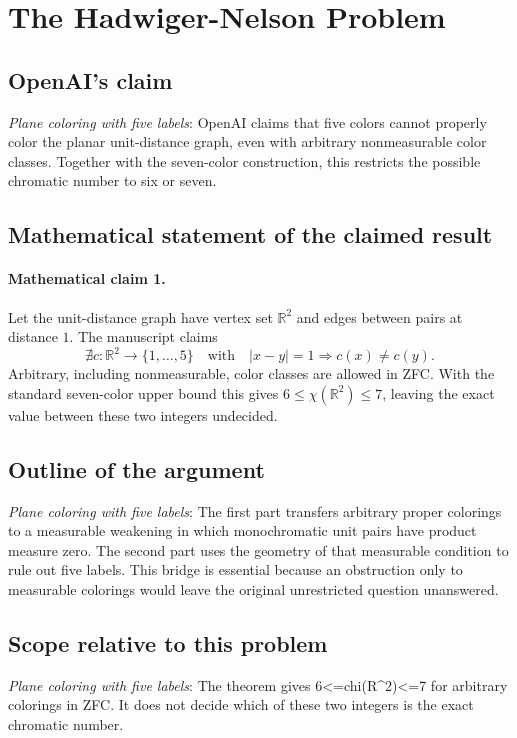 \documentclass[11pt]{article}
\begin{document}
\section*{The Hadwiger-Nelson Problem}

\subsection{OpenAI's claim}
\textit{Plane coloring with five labels}: OpenAI claims that five colors cannot properly color the planar unit-distance graph, even with arbitrary nonmeasurable color classes. Together with the seven-color construction, this restricts the possible chromatic number to six or seven.

\subsection{Mathematical statement of the claimed result}
\paragraph{Mathematical claim 1.} Let the unit-distance graph have vertex set $\mathbb R^2$ and edges between pairs at distance $1$. The manuscript claims \[\nexists c:\mathbb R^2\to\{1,\ldots,5\}\quad\text{with}\quad|x-y|=1\Longrightarrow c(x)\ne c(y).\] Arbitrary, including nonmeasurable, color classes are allowed in ZFC. With the standard seven-color upper bound this gives $6\le\chi(\mathbb R^2)\le7$, leaving the exact value between these two integers undecided.

\subsection{Outline of the argument}
\textit{Plane coloring with five labels}: The first part transfers arbitrary proper colorings to a measurable weakening in which monochromatic unit pairs have product measure zero. The second part uses the geometry of that measurable condition to rule out five labels. This bridge is essential because an obstruction only to measurable colorings would leave the original unrestricted question unanswered.

\subsection{Scope relative to this problem}
\textit{Plane coloring with five labels}: The theorem gives 6<=chi(R\textasciicircum{}2)<=7 for arbitrary colorings in ZFC. It does not decide which of these two integers is the exact chromatic number.
\end{document}
